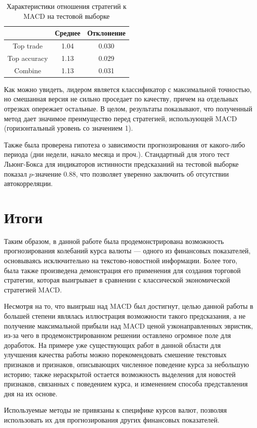 \documentclass[pdftex,14pt,a4paper]{extreport}
\begin{document}
\begin{table}[h]
\centering 
\begin{tabular}{| c | c | c |}
\hline
 & Среднее & Отклонение \\ \hline
Top trade & 1.04 & 0.030 \\ \hline
Top accuracy & 1.13 & 0.029 \\ \hline
Combine & 1.13 & 0.031 \\ \hline
\end{tabular}
\caption{Характеристики отношения стратегий к MACD на тестовой выборке\label{test_table_compare}}
\end{table}

Как можно увидеть, лидером является классификатор с максимальной точностью, но смешанная версия не сильно проседает по качеству,
причем на отдельных отрезках опережает остальные. В целом, результаты показывают, что полученный метод дает значимое преимущество перед стратегией, использующей MACD (горизонтальный уровень со значением 1).	

Также была проверена гипотеза о зависимости прогнозирования от какого-либо периода (дни недели, начало месяца и проч.).
Стандартный для этого тест Льюнг-Бокса\cite{ljungbox} для индикаторов истинности предсказаний на тестовой выборке
показал $p$-значение 0.88, что позволяет уверенно заключить об отсутствии автокорреляции.

\chapter{Итоги}

Таким образом, в данной работе была продемонстрирована возможность прогнозирования колебаний курса
валюты --- одного из финансовых показателей, основываясь исключительно на текстово-новостной информации.
Более того, была также произведена демонстрация его применения для создания торговой стратегии,
которая выигрывает в сравнении с классической экономической стратегией MACD.

Несмотря на то, что выигрыш над MACD был достигнут, целью данной работы в большей степени являлась иллюстрация
возможности такого предсказания, а не получение максимальной прибыли над MACD ценой узконаправленных эвристик,
из-за чего в продемонстрированном решении оставлено огромное поле для доработок.
На примере уже существующих работ в данной области для улучшения качества работы можно порекомендовать
смешение текстовых признаков и признаков, описывающих численное поведение курса за небольшую историю;
также нераскрытой остается возможность выделения для новостей признаков, связанных с поведением курса, и изменением
способа представления дня на их основе.

Используемые методы не привязаны к специфике курсов валют, позволяя использовать их для прогнозирования других
финансовых показателей.

{}

\end{document}

